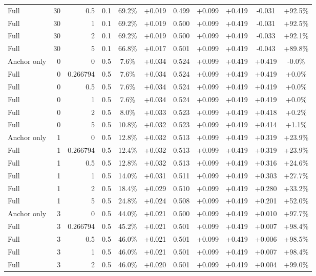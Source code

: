 \begin{table}[htbp]
\begin{tabular}{lrrrccccccc}
Full & 30 & 0.5 & 0.1 & 69.2\% & +0.019 & 0.499 & +0.099 & +0.419 & -0.031 & +92.5\% \\
Full & 30 & 1 & 0.1 & 69.2\% & +0.019 & 0.500 & +0.099 & +0.419 & -0.031 & +92.5\% \\
Full & 30 & 2 & 0.1 & 69.2\% & +0.019 & 0.500 & +0.099 & +0.419 & -0.033 & +92.1\% \\
Full & 30 & 5 & 0.1 & 66.8\% & +0.017 & 0.501 & +0.099 & +0.419 & -0.043 & +89.8\% \\
Anchor only & 0 & 0 & 0.5 & 7.6\% & +0.034 & 0.524 & +0.099 & +0.419 & +0.419 & -0.0\% \\
Full & 0 & 0.266794 & 0.5 & 7.6\% & +0.034 & 0.524 & +0.099 & +0.419 & +0.419 & +0.0\% \\
Full & 0 & 0.5 & 0.5 & 7.6\% & +0.034 & 0.524 & +0.099 & +0.419 & +0.419 & +0.0\% \\
Full & 0 & 1 & 0.5 & 7.6\% & +0.034 & 0.524 & +0.099 & +0.419 & +0.419 & +0.0\% \\
Full & 0 & 2 & 0.5 & 8.0\% & +0.033 & 0.523 & +0.099 & +0.419 & +0.418 & +0.2\% \\
Full & 0 & 5 & 0.5 & 10.8\% & +0.032 & 0.523 & +0.099 & +0.419 & +0.414 & +1.1\% \\
Anchor only & 1 & 0 & 0.5 & 12.8\% & +0.032 & 0.513 & +0.099 & +0.419 & +0.319 & +23.9\% \\
Full & 1 & 0.266794 & 0.5 & 12.4\% & +0.032 & 0.513 & +0.099 & +0.419 & +0.319 & +23.9\% \\
Full & 1 & 0.5 & 0.5 & 12.8\% & +0.032 & 0.513 & +0.099 & +0.419 & +0.316 & +24.6\% \\
Full & 1 & 1 & 0.5 & 14.0\% & +0.031 & 0.511 & +0.099 & +0.419 & +0.303 & +27.7\% \\
Full & 1 & 2 & 0.5 & 18.4\% & +0.029 & 0.510 & +0.099 & +0.419 & +0.280 & +33.2\% \\
Full & 1 & 5 & 0.5 & 24.8\% & +0.024 & 0.508 & +0.099 & +0.419 & +0.201 & +52.0\% \\
Anchor only & 3 & 0 & 0.5 & 44.0\% & +0.021 & 0.500 & +0.099 & +0.419 & +0.010 & +97.7\% \\
Full & 3 & 0.266794 & 0.5 & 45.2\% & +0.021 & 0.501 & +0.099 & +0.419 & +0.007 & +98.4\% \\
Full & 3 & 0.5 & 0.5 & 46.0\% & +0.021 & 0.501 & +0.099 & +0.419 & +0.006 & +98.5\% \\
Full & 3 & 1 & 0.5 & 46.0\% & +0.021 & 0.501 & +0.099 & +0.419 & +0.007 & +98.4\% \\
Full & 3 & 2 & 0.5 & 46.0\% & +0.020 & 0.501 & +0.099 & +0.419 & +0.004 & +99.0\% \\

\end{tabular}
\end{table}
